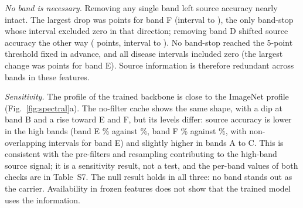 \textit{No band is necessary.} Removing any single band left source accuracy nearly intact. The largest drop was \RSpecMainTestStopFDeltaS{} points for band F (interval \RSpecMainTestStopFDeltaSLo{} to \RSpecMainTestStopFDeltaSHi), the only band-stop whose interval excluded zero in that direction; removing band D shifted source accuracy the other way (\RSpecMainTestStopDDeltaS{} points, interval \RSpecMainTestStopDDeltaSLo{} to \RSpecMainTestStopDDeltaSHi). No band-stop reached the 5-point threshold fixed in advance, and all disease intervals included zero (the largest change was \RSpecMainTestStopEDeltaD{} points for band E). Source information is therefore redundant across bands in these features.

\textit{Sensitivity.} The profile of the trained backbone is close to the ImageNet profile (Fig.~\ref{fig:spectral}a). The no-filter cache shows the same shape, with a dip at band B and a rise toward E and F, but its levels differ: source accuracy is lower in the high bands (band E \RSpecNofilterTestPassESrcBA\% against \RSpecMainTestPassESrcBA\%, band F \RSpecNofilterTestPassFSrcBA\% against \RSpecMainTestPassFSrcBA\%, with non-overlapping intervals for band E) and slightly higher in bands A to C. This is consistent with the pre-filters and resampling contributing to the high-band source signal; it is a sensitivity result, not a test, and the per-band values of both checks are in Table~S7. The null result holds in all three: no band stands out as the carrier. Availability in frozen features does not show that the trained model uses the information.

